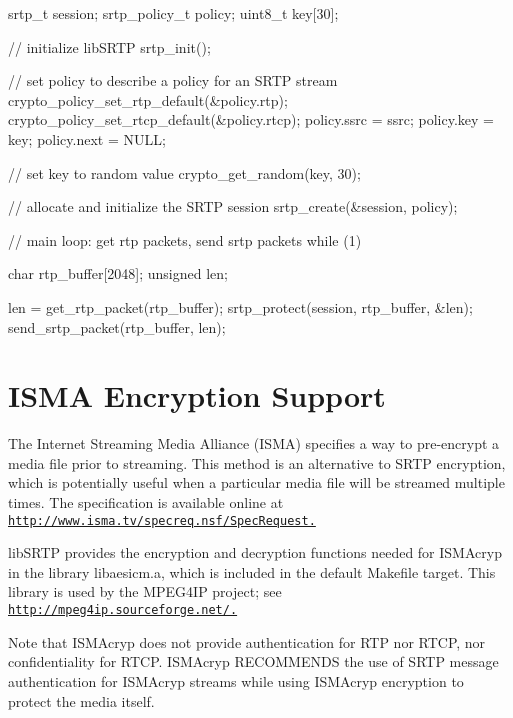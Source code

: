 \begin{DoxyVerb}
   srtp_t session;   
   srtp_policy_t policy;
   uint8_t key[30];

   // initialize libSRTP 
   srtp_init();                                  

   // set policy to describe a policy for an SRTP stream 
   crypto_policy_set_rtp_default(&policy.rtp);   
   crypto_policy_set_rtcp_default(&policy.rtcp); 
   policy.ssrc = ssrc;                            
   policy.key  = key;
   policy.next = NULL;

   // set key to random value 
   crypto_get_random(key, 30);          

   // allocate and initialize the SRTP session 
   srtp_create(&session, policy);  
   
   // main loop: get rtp packets, send srtp packets
   while (1) {
      char rtp_buffer[2048];
      unsigned len;

      len = get_rtp_packet(rtp_buffer);
      srtp_protect(session, rtp_buffer, &len);
      send_srtp_packet(rtp_buffer, len);
   }
\end{DoxyVerb}
\hypertarget{main_ISMAcryp}{}\section{ISMA Encryption Support}\label{main_ISMAcryp}
The Internet Streaming Media Alliance (ISMA) specifies a way to pre-\/encrypt a media file prior to streaming. This method is an alternative to SRTP encryption, which is potentially useful when a particular media file will be streamed multiple times. The specification is available online at \href{http://www.isma.tv/specreq.nsf/SpecRequest.}{\tt http://www.isma.tv/specreq.nsf/SpecRequest.}

libSRTP provides the encryption and decryption functions needed for ISMAcryp in the library  libaesicm.a, which is included in the default Makefile target. This library is used by the MPEG4IP project; see \href{http://mpeg4ip.sourceforge.net/.}{\tt http://mpeg4ip.sourceforge.net/.}

Note that ISMAcryp does not provide authentication for RTP nor RTCP, nor confidentiality for RTCP. ISMAcryp RECOMMENDS the use of SRTP message authentication for ISMAcryp streams while using ISMAcryp encryption to protect the media itself. 